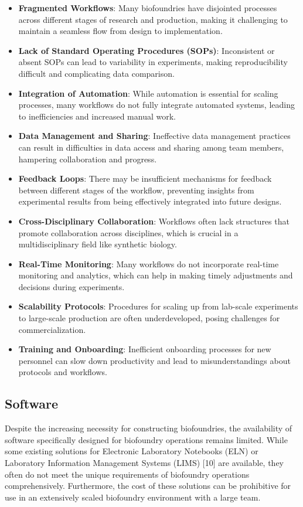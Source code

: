 \documentclass[
  letterpaper,
]{book}
\begin{document}
\begin{itemize}
\item
  \textbf{Fragmented Workflows}: Many biofoundries have disjointed
  processes across different stages of research and production, making
  it challenging to maintain a seamless flow from design to
  implementation.
\item
  \textbf{Lack of Standard Operating Procedures (SOPs)}: Inconsistent or
  absent SOPs can lead to variability in experiments, making
  reproducibility difficult and complicating data comparison.
\item
  \textbf{Integration of Automation}: While automation is essential for
  scaling processes, many workflows do not fully integrate automated
  systems, leading to inefficiencies and increased manual work.
\item
  \textbf{Data Management and Sharing}: Ineffective data management
  practices can result in difficulties in data access and sharing among
  team members, hampering collaboration and progress.
\item
  \textbf{Feedback Loops}: There may be insufficient mechanisms for
  feedback between different stages of the workflow, preventing insights
  from experimental results from being effectively integrated into
  future designs.
\item
  \textbf{Cross-Disciplinary Collaboration}: Workflows often lack
  structures that promote collaboration across disciplines, which is
  crucial in a multidisciplinary field like synthetic biology.
\item
  \textbf{Real-Time Monitoring}: Many workflows do not incorporate
  real-time monitoring and analytics, which can help in making timely
  adjustments and decisions during experiments.
\item
  \textbf{Scalability Protocols}: Procedures for scaling up from
  lab-scale experiments to large-scale production are often
  underdeveloped, posing challenges for commercialization.
\item
  \textbf{Training and Onboarding}: Inefficient onboarding processes for
  new personnel can slow down productivity and lead to misunderstandings
  about protocols and workflows.
\end{itemize}

\subsection{Software}\label{software}

Despite the increasing necessity for constructing biofoundries, the
availability of software specifically designed for biofoundry operations
remains limited. While some existing solutions for Electronic Laboratory
Notebooks (ELN) or Laboratory Information Management Systems (LIMS)
{[}10{]} are available, they often do not meet the unique requirements
of biofoundry operations comprehensively. Furthermore, the cost of these
solutions can be prohibitive for use in an extensively scaled biofoundry
environment with a large team.
\end{document}
